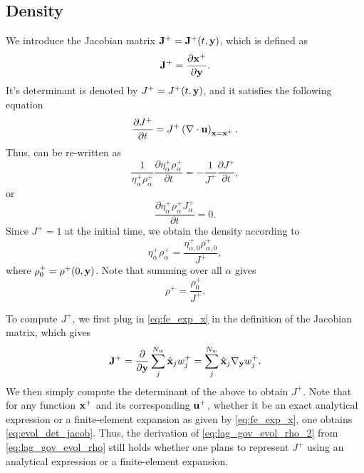 \documentclass[11pt]{report}
\begin{document}
\subsection{Density}
We introduce the Jacobian matrix $\mathbf{J}^+ = \mathbf{J}^+(t,\mathbf{y})$, which is defined as 
\begin{equation}
    \mathbf{J}^+ =  \frac{\partial \mathbf{x}^+ }{ \partial \mathbf{y}}.
\end{equation}
It's determinant is denoted by $J^+ = J^+(t,\mathbf{y})$, and it satisfies the following equation
\begin{equation}
    \label{eq:evol_det_jacob}
    \frac{\partial J^+}{\partial t} = J^+ \left( \nabla \cdot \mathbf{u} \right)_{\mathbf{x} = \mathbf{x}^+}.
\end{equation}
Thus,  can be re-written as
\begin{equation*}
    \frac{1}{\eta^+_\alpha \rho^+_\alpha} \frac{\partial \eta^+_\alpha \rho^+_\alpha}{\partial t} = -\frac{1}{J^+} \frac{\partial J^+}{\partial t},
\end{equation*}
or
\begin{equation}
    \label{eq:lag_gov_evol_rho_2}
    \frac{\partial \eta^+_\alpha \rho^+_\alpha J^+_\alpha}{\partial t} = 0.
\end{equation}
Since $J^+ = 1$ at the initial time, we obtain the density according to
\begin{equation}
    \label{eq:evol_rho_semi_discrete}
    \eta^+_\alpha \rho^+_\alpha = \frac{\eta^+_{\alpha,0}\rho^+_{\alpha,0}}{J^+},
\end{equation}
where $\rho^+_0 = \rho^+(0,\mathbf{y})$. Note that summing over all $\alpha$ gives
\begin{equation}
    \label{eq:evol_total_rho_semi_discrete}
    \rho^+ = \frac{\rho^+_0}{J^+}.
\end{equation}

To compute $J^+$, we first plug in \cref{eq:fe_exp_x} in the definition of the Jacobian matrix, which gives
\begin{equation*}
    \mathbf{J}^+ = \frac{\partial}{\partial \mathbf{y}} \sum_j^{N_w} \hat{\mathbf{x}}_j w^+_j = \sum_j^{N_w} \hat{\mathbf{x}}_j \nabla_{\mathbf{y}} w^+_j.
\end{equation*}
We then simply compute the determinant of the above to obtain $J^+$. Note that for any function $\mathbf{x}^+$ and its corresponding $\mathbf{u}^+$, whether it be an exact analytical expression or a finite-element expansion as given by \cref{eq:fe_exp_x}, one obtains \cref{eq:evol_det_jacob}. Thus, the derivation of \cref{eq:lag_gov_evol_rho_2} from \cref{eq:lag_gov_evol_rho} still holds whether one plans to represent $J^+$ using an analytical expression or a finite-element expansion. 
\end{document}
